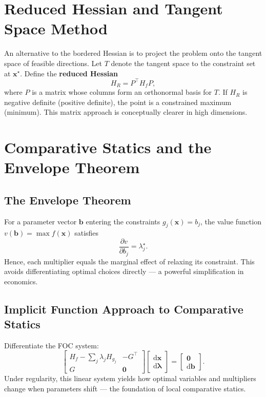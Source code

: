 \documentclass[12pt]{article}
\newcommand{\ve}[1]{\boldsymbol{#1}}
\begin{document}
\section*{Reduced Hessian and Tangent Space Method}

An alternative to the bordered Hessian is to project the problem onto the tangent space of feasible directions.  
Let \(T\) denote the tangent space to the constraint set at \(\ve{x}^\star\).  
Define the \textbf{reduced Hessian}
\[
H_R = P^\top H_f P,
\]
where \(P\) is a matrix whose columns form an orthonormal basis for \(T\).  
If \(H_R\) is negative definite (positive definite), the point is a constrained maximum (minimum).  
This matrix approach is conceptually clearer in high dimensions.

\section*{Comparative Statics and the Envelope Theorem}

\subsection*{The Envelope Theorem}

For a parameter vector \(\ve{b}\) entering the constraints \(g_j(\ve{x})=b_j\),
the value function \(v(\ve{b}) = \max f(\ve{x})\) satisfies
\[
\frac{\partial v}{\partial b_j} = \lambda_j^\star.
\]
Hence, each multiplier equals the marginal effect of relaxing its constraint.  
This avoids differentiating optimal choices directly — a powerful simplification in economics.

\subsection*{Implicit Function Approach to Comparative Statics}

Differentiate the FOC system:
\[
\begin{bmatrix}
H_f - \sum_j \lambda_j H_{g_j} & -G^\top\\
G & \ve{0}
\end{bmatrix}
\begin{bmatrix}
\mathrm{d}\ve{x}\\[2pt] \mathrm{d}\ve{\lambda}
\end{bmatrix}
=
\begin{bmatrix}
\ve{0}\\[2pt] \mathrm{d}\ve{b}
\end{bmatrix}.
\]
Under regularity, this linear system yields how optimal variables and multipliers change when parameters shift — the foundation of local comparative statics.
\end{document}
